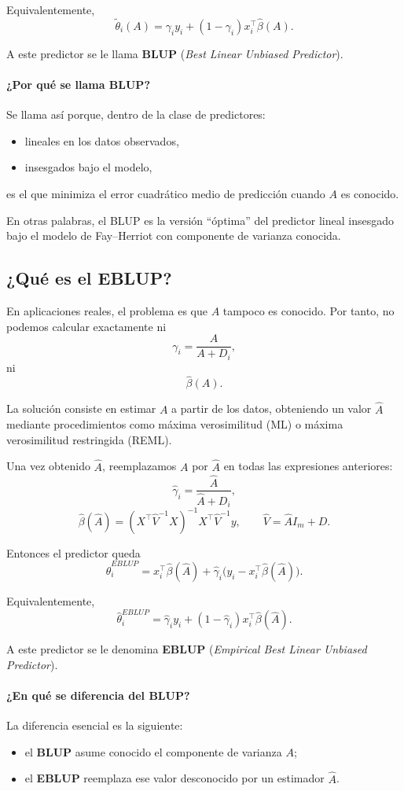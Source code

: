 Equivalentemente,
\[
\tilde{\theta}_i(A)
=
\gamma_i y_i + (1-\gamma_i)x_i^{\top}\hat{\beta}(A).
\]

A este predictor se le llama \textbf{BLUP} (\textit{Best Linear Unbiased Predictor}).

\paragraph{¿Por qué se llama BLUP?}
Se llama así porque, dentro de la clase de predictores:
\begin{itemize}
    \item lineales en los datos observados,
    \item insesgados bajo el modelo,
\end{itemize}
es el que minimiza el error cuadrático medio de predicción cuando $A$ es conocido.

En otras palabras, el BLUP es la versión ``óptima'' del predictor lineal insesgado bajo el modelo de Fay--Herriot con componente de varianza conocida.

\subsection{¿Qué es el EBLUP?}

En aplicaciones reales, el problema es que $A$ tampoco es conocido. Por tanto, no podemos calcular exactamente ni
\[
\gamma_i=\frac{A}{A+D_i},
\]
ni
\[
\hat{\beta}(A).
\]

La solución consiste en estimar $A$ a partir de los datos, obteniendo un valor $\hat A$ mediante procedimientos como máxima verosimilitud (ML) o máxima verosimilitud restringida (REML).

Una vez obtenido $\hat A$, reemplazamos $A$ por $\hat A$ en todas las expresiones anteriores:
\[
\hat{\gamma}_i=\frac{\hat A}{\hat A+D_i},
\]
\[
\hat{\beta}(\hat A)=
(X^{\top}\hat V^{-1}X)^{-1}X^{\top}\hat V^{-1}y,
\qquad
\hat V=\hat A I_m+D.
\]

Entonces el predictor queda
\[
\hat{\theta}_i^{EBLUP}
=
x_i^{\top}\hat{\beta}(\hat A)
+
\hat{\gamma}_i\bigl(y_i-x_i^{\top}\hat{\beta}(\hat A)\bigr).
\]

Equivalentemente,
\[
\hat{\theta}_i^{EBLUP}
=
\hat{\gamma}_i y_i + (1-\hat{\gamma}_i)x_i^{\top}\hat{\beta}(\hat A).
\]

A este predictor se le denomina \textbf{EBLUP} (\textit{Empirical Best Linear Unbiased Predictor}).

\paragraph{¿En qué se diferencia del BLUP?}
La diferencia esencial es la siguiente:
\begin{itemize}
    \item el \textbf{BLUP} asume conocido el componente de varianza $A$;
    \item el \textbf{EBLUP} reemplaza ese valor desconocido por un estimador $\hat A$.
\end{itemize}

